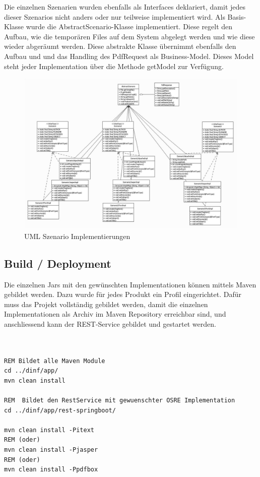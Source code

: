 \documentclass[main.tex]{subfiles}
\begin{document}
Die einzelnen Szenarien wurden ebenfalls als Interfaces deklariert, damit jedes dieser Szenarios nicht anders oder nur teilweise implementiert wird. Als Basis-Klasse wurde die AbstractScenario-Klasse implementiert. Diese regelt den Aufbau, wie die temporären Files auf dem System abgelegt werden und wie diese wieder abgeräumt werden. Diese abstrakte Klasse übernimmt ebenfalls den Aufbau und und das Handling des PdfRequest als Business-Model. Dieses Model steht jeder Implementation über die Methode getModel zur Verfügung.   

\begin{figure}[h]
\includegraphics[width=\textwidth ]{pic/uml/SzenarioImplementation.jpg}
 \caption{UML Szenario Implementierungen}
 \label{figure:szenImpl}
\end{figure}



\subsection{Build / Deployment}

Die einzelnen Jars mit den gewünschten Implementationen können mittels Maven gebildet werden. Dazu wurde für jedes Produkt ein Profil eingerichtet. Dafür muss das Projekt vollständig gebildet werden, damit die einzelnen Implementationen als Archiv im Maven Repository erreichbar sind, und anschliessend kann der REST-Service gebildet und gestartet werden.  

\begin{lstlisting}[language=command.com]


REM Bildet alle Maven Module 
cd ../dinf/app/ 
mvn clean install 

REM  Bildet den RestService mit gewuenschter OSRE Implementation     
cd ../dinf/app/rest-springboot/

mvn clean install -Pitext
REM (oder)
mvn clean install -Pjasper
REM (oder)
mvn clean install -Ppdfbox
\end{lstlisting}
\end{document}
